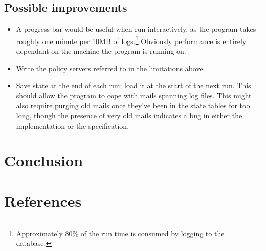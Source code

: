 \documentclass[a4paper,12pt,draft]{article}
\begin{document}
\subsection{Possible improvements}
\begin{itemize}

    \item A progress bar would be useful when run interactively, as the
        program takes roughly one minute per 10MB of
        logs.\footnote{Approximately 80\% of the run time is consumed by
        logging to the database.}  Obviously performance is entirely
        dependant on the machine the program is running on.

    \item Write the policy servers referred to in the limitations above.

    \item Save state at the end of each run; load it at the start of the
        next run.  This should allow the program to cope with mails
        spanning log files.  This might also require purging old mails once
        they've been in the state tables for too long, though the presence
        of very old mails indicates a bug in either the implementation or
        the specification.

\end{itemize}

\section{Conclusion}

\appendix

\section{References}
\end{document}
